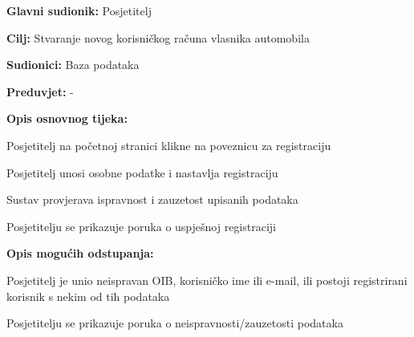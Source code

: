 					
					\noindent {}
					\begin{packed_item}
						
						\item \textbf{Glavni sudionik: } Posjetitelj
						\item  \textbf{Cilj:} Stvaranje novog korisničkog računa vlasnika automobila
						\item  \textbf{Sudionici:} Baza podataka
						\item  \textbf{Preduvjet:} -
						\item  \textbf{Opis osnovnog tijeka:} 
						
						\item[] \begin{packed_enum}
							
							\item Posjetitelj na početnoj stranici klikne na poveznicu za registraciju
							\item Posjetitelj unosi osobne podatke i nastavlja registraciju
							\item Sustav provjerava ispravnost i zauzetost upisanih podataka
							\item Posjetitelju se prikazuje poruka o uspješnoj registraciji
						\end{packed_enum}
						
						\item  \textbf{Opis mogućih odstupanja:}
						
						\item[] \begin{packed_item}
							
							\item[3.a] Posjetitelj je unio neispravan OIB, korisničko ime ili e-mail, ili postoji registrirani korisnik s nekim od tih podataka
							\item[] \begin{packed_enum}
								
								\item Posjetitelju se prikazuje poruka o neispravnosti/zauzetosti podataka
								
							\end{packed_enum}
							
						\end{packed_item}
					\end{packed_item}
				
